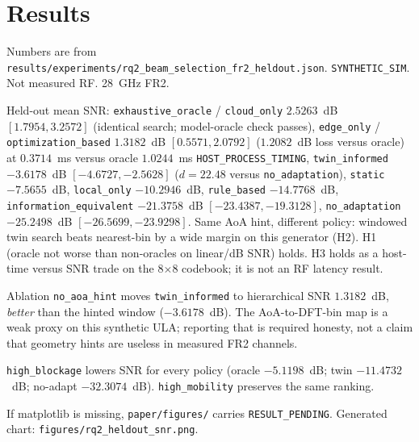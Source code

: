 \section{Results}
Numbers are from \texttt{results/experiments/rq2\_beam\_selection\_fr2\_heldout.json}.
\texttt{SYNTHETIC\_SIM}. Not measured RF. 28~GHz FR2.



Held-out mean SNR:
\texttt{exhaustive\_oracle} / \texttt{cloud\_only} $2.5263$~dB $[1.7954,3.2572]$ (identical search; model-oracle check passes),
\texttt{edge\_only} / \texttt{optimization\_based} $1.3182$~dB $[0.5571,2.0792]$ ($1.2082$~dB loss versus oracle) at $0.3714$~ms versus oracle $1.0244$~ms \texttt{HOST\_PROCESS\_TIMING},
\texttt{twin\_informed} $-3.6178$~dB $[{-}4.6727,{-}2.5628]$ ($d=22.48$ versus \texttt{no\_adaptation}),
\texttt{static} $-7.5655$~dB,
\texttt{local\_only} $-10.2946$~dB,
\texttt{rule\_based} $-14.7768$~dB,
\texttt{information\_equivalent} $-21.3758$~dB $[{-}23.4387,{-}19.3128]$,
\texttt{no\_adaptation} $-25.2498$~dB $[{-}26.5699,{-}23.9298]$.
Same AoA hint, different policy: windowed twin search beats nearest-bin by a wide margin on this generator (H2).
H1 (oracle not worse than non-oracles on linear/dB SNR) holds.
H3 holds as a host-time versus SNR trade on the 8$\times$8 codebook; it is not an RF latency result.



Ablation \texttt{no\_aoa\_hint} moves \texttt{twin\_informed} to hierarchical SNR $1.3182$~dB, \emph{better} than the hinted window ($-3.6178$~dB).
The AoA-to-DFT-bin map is a weak proxy on this synthetic ULA; reporting that is required honesty, not a claim that geometry hints are useless in measured FR2 channels.



\texttt{high\_blockage} lowers SNR for every policy (oracle $-5.1198$~dB; twin $-11.4732$~dB; no-adapt $-32.3074$~dB).
\texttt{high\_mobility} preserves the same ranking.

If matplotlib is missing, \texttt{paper/figures/} carries \texttt{RESULT\_PENDING}. Generated chart: \texttt{figures/rq2\_heldout\_snr.png}.

